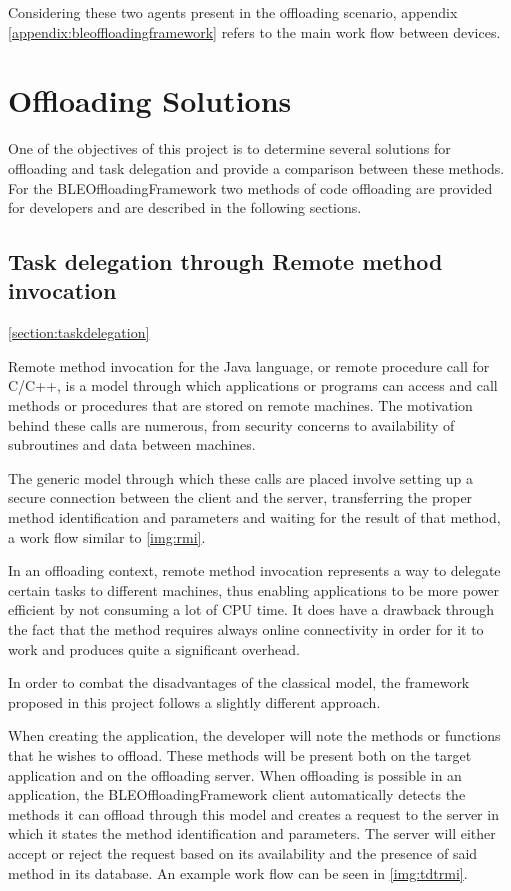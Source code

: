 	Considering these two agents present in the offloading scenario, appendix \ref{appendix:bleoffloadingframework} refers to the main work flow between devices.
	
\section{Offloading Solutions}
\label{offloadingsolutions}

	One of the objectives of this project is to determine several solutions for offloading and task delegation and provide a comparison between these methods. For the BLEOffloadingFramework two methods of code offloading are provided for developers and are described in the following sections.

\subsection{Task delegation through Remote method invocation}
\ref{section:taskdelegation}

	Remote method invocation \cite{downing1998java} for the Java language, or remote procedure call for C/C++, is a model through which applications or programs can access and call methods or procedures that are stored on remote machines. The motivation behind these calls are numerous, from security concerns to availability of subroutines and data between machines.
	
	The generic model through which these calls are placed involve setting up a secure connection between the client and the server, transferring the proper method identification and parameters and waiting for the result of that method, a work flow similar to \ref{img:rmi}.
	

	In an offloading context, remote method invocation represents a way to delegate certain tasks to different machines, thus enabling applications to be more power efficient by not consuming a lot of CPU time. It does have a drawback through the fact that the method requires always online connectivity in order for it to work and produces quite a significant overhead.
	
	In order to combat the disadvantages of the classical model, the framework proposed in this project follows a slightly different approach.
	
	When creating the application, the developer will note the methods or functions that he wishes to offload. These methods will be present both on the target application and on the offloading server. When offloading is possible in an application, the BLEOffloadingFramework client automatically detects the methods it can offload through this model and creates a request to the server in which it states the method identification and parameters. The server will either accept or reject the request based on its availability and the presence of said method in its database. An example work flow can be seen in \ref{img:tdtrmi}.
	
